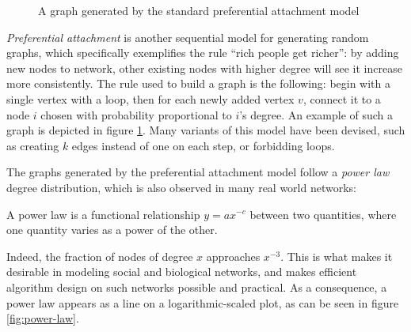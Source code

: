 \begin{figure}[ht]
    \centering
    \caption{A graph generated by the standard preferential attachment model}
    \label{fig:pref-att}
\end{figure}

\emph{Preferential attachment} is another sequential model for generating random graphs, which specifically exemplifies the rule ``rich people get richer'': by adding new nodes to network, other existing nodes with higher degree will see it increase more consistently. The rule used to build a graph is the following: begin with a single vertex with a loop, then for each newly added vertex $v$, connect it to a node $i$ chosen with probability proportional to $i$'s degree. An example of such a graph is depicted in figure \ref{fig:pref-att}. Many variants of this model have been devised, such as creating $k$ edges instead of one on each step, or forbidding loops.

The graphs generated by the preferential attachment model follow a \emph{power law} degree distribution, which is also observed in many real world networks: 

\begin{definition}
    A power law is a functional relationship $y = ax^{-c}$ between two quantities, where one quantity varies as a power of the other.
\end{definition}

Indeed, the fraction of nodes of degree $x$ approaches $x^{-3}$. This is what makes it desirable in modeling social and biological networks, and makes efficient algorithm design on such networks possible and practical. As a consequence, a power law appears as a line on a logarithmic-scaled plot, as can be seen in figure \ref{fig:power-law}.

